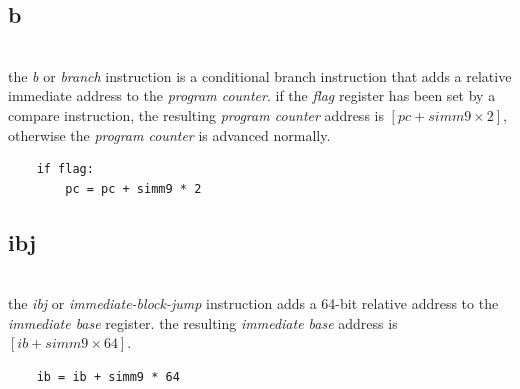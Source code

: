 \subsection{b}
\\
the \emph{b} or \emph{branch} instruction is a conditional branch instruction
that adds a relative immediate address to the \emph{program counter}. if the
\emph{flag} register has been set by a compare instruction, the resulting
\emph{program counter} address is \emph{$[pc + simm9 \times 2]$},
otherwise the \emph{program counter} is advanced normally.
\begin{Verbatim}
    if flag:
        pc = pc + simm9 * 2
\end{Verbatim}

\subsection{ibj}
\\
the \emph{ibj} or \emph{immediate-block-jump} instruction adds a
64-bit relative address to the \emph{immediate base} register.
the resulting \emph{immediate base} address is \emph{$[ib + simm9 \times 64]$}.
\begin{Verbatim}
    ib = ib + simm9 * 64
\end{Verbatim}

